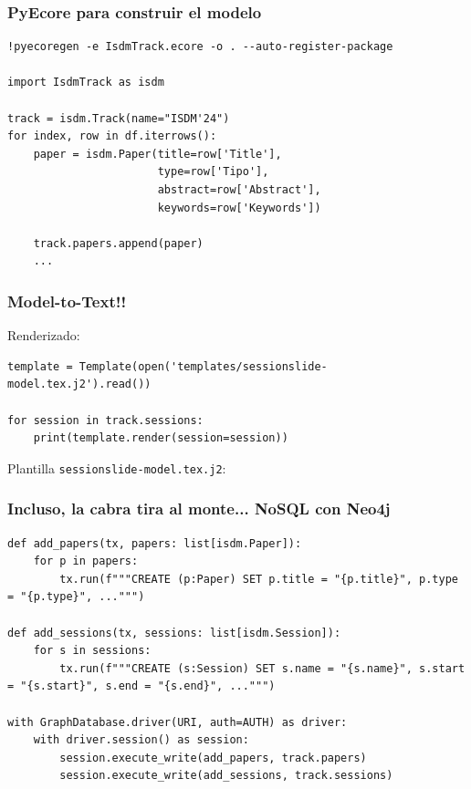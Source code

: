\begin{frame}[fragile]
  \frametitle{PyEcore para construir el modelo}
\begin{lstlisting}[basicstyle=\large\tt]
%pip install pyecore pyecoregen
!pyecoregen -e IsdmTrack.ecore -o . --auto-register-package

import IsdmTrack as isdm

track = isdm.Track(name="ISDM'24")
for index, row in df.iterrows():
    paper = isdm.Paper(title=row['Title'],
                       type=row['Tipo'],
                       abstract=row['Abstract'],
                       keywords=row['Keywords'])

    track.papers.append(paper)
    ...
\end{lstlisting}
\end{frame}


\begin{frame}[fragile]
  \frametitle{Model-to-Text!!}
Renderizado:
\begin{lstlisting}
template = Template(open('templates/sessionslide-model.tex.j2').read())

for session in track.sessions:
    print(template.render(session=session))
\end{lstlisting}



  Plantilla {\tt sessionslide-model.tex.j2}:

\end{frame}

\begin{frame}[fragile]
  \frametitle{Incluso, la cabra tira al monte... NoSQL con Neo4j}

\begin{lstlisting}
def add_papers(tx, papers: list[isdm.Paper]):
    for p in papers:
        tx.run(f"""CREATE (p:Paper) SET p.title = "{p.title}", p.type = "{p.type}", ...""")

def add_sessions(tx, sessions: list[isdm.Session]):
    for s in sessions:
        tx.run(f"""CREATE (s:Session) SET s.name = "{s.name}", s.start = "{s.start}", s.end = "{s.end}", ...""")

with GraphDatabase.driver(URI, auth=AUTH) as driver:
    with driver.session() as session:
        session.execute_write(add_papers, track.papers)
        session.execute_write(add_sessions, track.sessions)
\end{lstlisting}
\end{frame}


